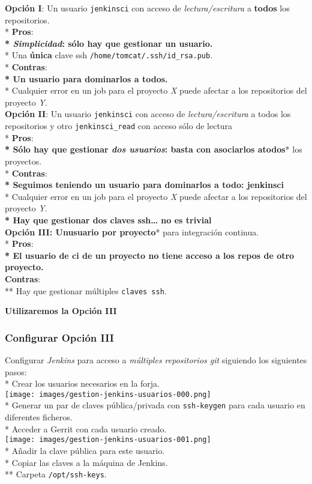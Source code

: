 \textbf{Opción I}: Un usuario \texttt{jenkinsci} con acceso de
\emph{lectura/escritura} a \textbf{todos} los repositorios.\\*
\textbf{Pros}:\\\textbf{* \emph{Simplicidad}: sólo hay que gestionar un
usuario.\\}* Una \textbf{única} clave ssh
\texttt{/home/tomcat/.ssh/id\_rsa.pub}.\\* \textbf{Contras}:\\\textbf{*
Un usuario para dominarlos a todos.\\}* Cualquier error en un job para
el proyecto \emph{X} puede afectar a los repositorios del proyecto
\emph{Y}.\\\textbf{Opción II}: Un usuario \texttt{jenkinsci} con acceso
de \emph{lectura/escritura} a todos los repositorios y otro
\texttt{jenkinsci\_read} con acceso sólo de lectura\\*
\textbf{Pros}:\\\textbf{* Sólo hay que gestionar \emph{dos usuarios}:
basta con asociarlos a}\textbf{todos}* los proyectos.\\*
\textbf{Contras}:\\\textbf{* Seguimos teniendo un usuario para
dominarlos a todo: jenkinsci\\}* Cualquier error en un job para el
proyecto \emph{X} puede afectar a los repositorios del proyecto
\emph{Y}.\\\textbf{* Hay que gestionar dos claves ssh\ldots{} no es
trivial\\}\textbf{Opción III}\textbf{: Un}\textbf{usuario por proyecto}*
para integración continua.\\* \textbf{Pros}:\\\textbf{* El usuario de ci
de un proyecto no tiene acceso a los repos de otro proyecto.\\}
\textbf{Contras}:\\** Hay que gestionar múltiples \texttt{claves ssh}.

\textbf{Utilizaremos la Opción III}

\subsubsection{Configurar Opción III}

Configurar \emph{Jenkins} para acceso a \emph{múltiples repositorios
git} siguiendo los siguientes pasos:\\* Crear los usuarios necesarios en
la forja.\\\texttt{[image: images/gestion-jenkins-usuarios-000.png]}\\*
Generar un par de claves pública/privada con \texttt{ssh-keygen} para
cada usuario en diferentes ficheros.\\* Acceder a Gerrit con cada
usuario
creado.\\\texttt{[image: images/gestion-jenkins-usuarios-001.png]}\\*
Añadir la clave pública para este usuario.\\* Copiar las claves a la
máquina de Jenkins.\\** Carpeta \texttt{/opt/ssh-keys}.

